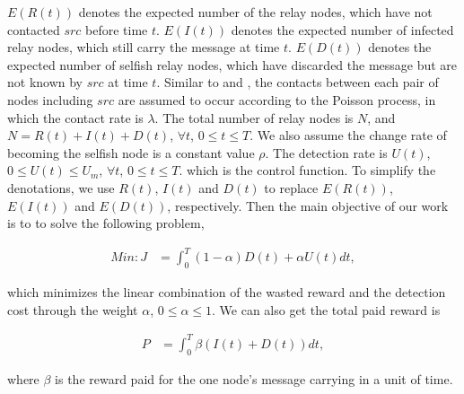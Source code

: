 $E(R(t))$ denotes the expected number of the relay nodes,
which have not contacted $src$ before time $t$.
$E(I(t))$ denotes the expected number of infected relay nodes,
which still carry the message at time $t$.
$E(D(t))$ denotes the expected number of selfish relay nodes,
which have discarded the message but are not known by $src$
at time $t$.
Similar to \cite{TCSS2018ControlM} and \cite{CC2007PerfAnaly},
the contacts between each pair of nodes including $src$
are assumed to occur according to the Poisson process,
in which the contact rate is $\lambda$.
The total number of relay nodes is $N$,
and $N=R(t)+I(t)+D(t)$, $\forall t$, $0 \le t \le T$.
We also assume the change rate of
becoming the selfish node is a constant value $\rho$.
The detection rate is $U(t)$,
$0 \le U(t) \le U_{m}$, $\forall t$, $0 \le t \le T$.
which is the control function.
To simplify the denotations,
we use $R(t)$, $I(t)$ and $D(t)$ to
replace $E(R(t))$, $E(I(t))$ and $E(D(t))$,
respectively.
Then the main objective of our work is to 
to solve the following problem,
\begin{small}
\begin{equation}
\label{eq:obj}
\begin{aligned}
Min: J &= \int_{0}^{T} (1-\alpha) D(t) + \alpha U(t) dt ,
\end{aligned}
\end{equation}
\end{small}
which minimizes the linear combination of 
the wasted reward and the detection cost through the weight $\alpha$, $0 \le \alpha \le 1$.
We can also get the total paid reward is
\begin{small}
\begin{equation}
\label{eq:reward}
\begin{aligned}
P &= \int_{0}^{T} \beta ( I(t) + D(t) )dt,
\end{aligned}
\end{equation}
\end{small}
where $\beta$ is the reward paid for the one node's message carrying in a unit of time.